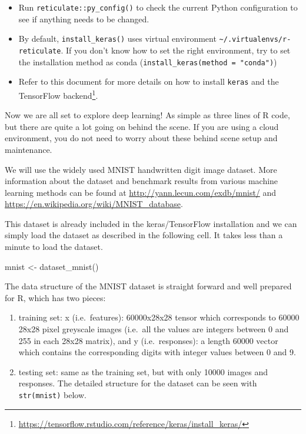 \documentclass[
  12pt,
]{krantz}
\makeatletter
\newenvironment{Shaded}{\begin{snugshade}}{\end{snugshade}}
\newcommand{\FunctionTok}[1]{\textcolor[rgb]{0,0,0}{#1}}
\newcommand{\NormalTok}[1]{#1}
\newcommand{\OtherTok}[1]{\textcolor[rgb]{0.37,0.37,0.37}{#1}}
\providecommand{\tightlist}{%
  \setlength{\itemsep}{0pt}\setlength{\parskip}{0pt}}
\renewcommand{\href}[2]{#2\footnote{\url{#1}}}
\newenvironment{kframe}{%
\medskip{}
\setlength{\fboxsep}{.8em}
 \def\at@end@of@kframe{}%
 \ifinner\ifhmode%
  \def\at@end@of@kframe{\end{minipage}}%
  \begin{minipage}{\columnwidth}%
 \fi\fi%
 \def\FrameCommand##1{\hskip\@totalleftmargin \hskip-\fboxsep
 \colorbox{shadecolor}{##1}\hskip-\fboxsep
     \hskip-\linewidth \hskip-\@totalleftmargin \hskip\columnwidth}%
 \MakeFramed {\advance\hsize-\width
   \@totalleftmargin\z@ \linewidth\hsize
   \@setminipage}}%
 {\par\unskip\endMakeFramed%
 \at@end@of@kframe}
\renewenvironment{Shaded}{\begin{kframe}}{\end{kframe}}
\makeatother
\begin{document}
\begin{itemize}
\tightlist
\item
  Run \texttt{reticulate::py\_config()} to check the current Python configuration to see if anything needs to be changed.
\item
  By default, \texttt{install\_keras()} uses virtual environment \texttt{\textasciitilde{}/.virtualenvs/r-reticulate}. If you don't know how to set the right environment, try to set the installation method as conda (\texttt{install\_keras(method\ =\ "conda")})
\item
  Refer to this document for more details on how to \href{https://tensorflow.rstudio.com/reference/keras/install_keras/}{install \texttt{keras} and the TensorFlow backend}.
\end{itemize}

Now we are all set to explore deep learning! As simple as three lines of R code, but there are quite a lot going on behind the scene. If you are using a cloud environment, you do not need to worry about these behind scene setup and maintenance.

We will use the widely used MNIST handwritten digit image dataset. More information about the dataset and benchmark results from various machine learning methods can be found at \url{http://yann.lecun.com/exdb/mnist/} and \url{https://en.wikipedia.org/wiki/MNIST_database}.

This dataset is already included in the keras/TensorFlow installation and we can simply load the dataset as described in the following cell. It takes less than a minute to load the dataset.

\begin{Shaded}
\begin{Highlighting}[]
\NormalTok{mnist }\OtherTok{\textless{}{-}} \FunctionTok{dataset\_mnist}\NormalTok{()}
\end{Highlighting}
\end{Shaded}

The data structure of the MNIST dataset is straight forward and well prepared for R, which has two pieces:

\begin{enumerate}
\def\labelenumi{(\arabic{enumi})}
\item
  training set: x (i.e.~features): 60000x28x28 tensor which corresponds to 60000 28x28 pixel greyscale images (i.e.~all the values are integers between 0 and 255 in each 28x28 matrix), and y (i.e.~responses): a length 60000 vector which contains the corresponding digits with integer values between 0 and 9.
\item
  testing set: same as the training set, but with only 10000 images and responses. The detailed structure for the dataset can be seen with \texttt{str(mnist)} below.
\end{enumerate}
\end{document}
